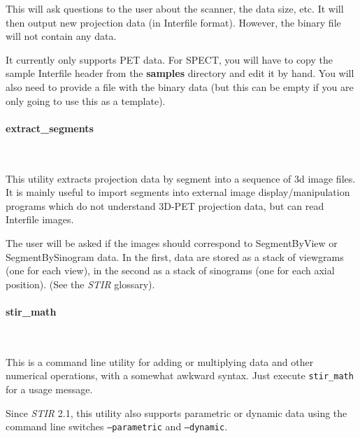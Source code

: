 \documentclass{article}
\newcommand{\subsubsubsection}[1]{\paragraph{#1}\mbox{} \\}
\begin{document}
This will ask questions to the user about the scanner, the data 
size, etc. It will then output new projection data (in Interfile 
format). However, the binary file will not contain any data.

It currently only supports PET data. For SPECT, you will have to copy the
sample Interfile header from the \textbf{samples} directory and edit it by hand.
You will also need to provide a file with the binary data (but this can be empty if
you are only going to use this as a template).

{ \subsubsubsection{extract\_segments}
}

This utility extracts projection data by segment into a sequence 
of 3d image files. It is mainly useful to import segments into 
external image display/manipulation programs which do not understand 
3D-PET projection data, but can read Interfile images.


The user will be asked if the images should correspond to SegmentByView 
or SegmentBySinogram data. In the first, data are stored as a 
stack of viewgrams (one for each view), in the second as a stack 
of sinograms (one for each axial position). (See the \textit{STIR} glossary).

{ \subsubsubsection{stir\_math}
}
\label{sec:stir_math}

This is a command line utility for adding or multiplying data 
and other numerical operations, with a somewhat awkward syntax. 
Just execute \texttt{stir\_math} for a usage message.

Since \textit{STIR} 2.1, this utility also supports parametric or dynamic data using
the command line switches \texttt{--parametric} and \texttt{--dynamic}.
\end{document}
